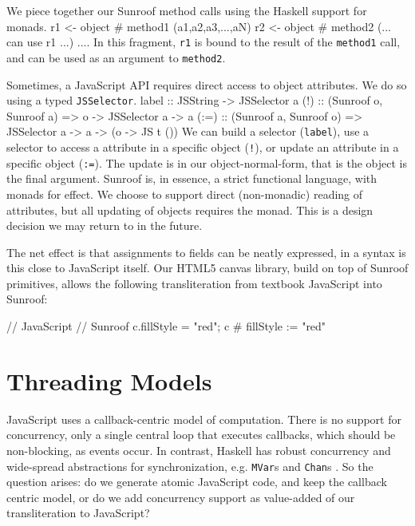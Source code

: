 \documentclass{llncs}
\newcommand{\Src}[1]{{\tt{#1}}}
\newenvironment{Code}{\verbatim}{\endverbatim}
\begin{document}
We piece together our Sunroof method calls using the Haskell support for monads.
\begin{Code}
  r1 <- object # method1 (a1,a2,a3,...,aN)
  r2 <- object # method2 (... can use r1 ...)
  ....
\end{Code} 
In this fragment, \Src{r1} is bound to the result of the \Src{method1} call,
and can be used as an argument to \Src{method2}.

Sometimes, a JavaScript API requires direct access to object attributes.
We do so using a typed \Src{JSSelector}.
\begin{Code}
label :: JSString -> JSSelector a
(!)   :: (Sunroof o, Sunroof a) => o -> JSSelector a -> a
(:=)  :: (Sunroof a, Sunroof o) 
      => JSSelector a -> a -> (o -> JS t ())
\end{Code}
We can build a selector (\Src{label}), use a selector to access a attribute in a specific
object (\Src{!}), or update an attribute in a specific object (\Src{:=}).
The update is in our object-normal-form, that is the object is the final argument.
Sunroof is, in essence, a strict functional language, with monads for effect.
We choose to support direct (non-monadic) reading of attributes, but
all updating of objects requires the monad.
This is a design decision we may return to in the future.

The net effect is that assignments to fields can be neatly expressed,
in a syntax is this close to JavaScript itself. Our HTML5 canvas library,
build on top of Sunroof primitives, allows the following transliteration
from textbook JavaScript into Sunroof:

\begin{Code}
  // JavaScript                         // Sunroof
  c.fillStyle = "red";                  c # fillStyle := "red"
\end{Code}



\section{Threading Models}
\label{sec:threading-models}

JavaScript uses a callback-centric model of computation. There
is no support for concurrency, only a single central loop that executes
callbacks, which should be non-blocking, as events occur.
In contrast, Haskell has robust concurrency and wide-spread 
abstractions for synchronization, e.g. \Src{MVar}s and \Src{Chan}s
\cite{Jones:96:ConcurrentHaskell}.
So the question arises: do we generate atomic JavaScript code, 
and keep the callback centric model, or do we add concurrency
support as value-added of our transliteration to JavaScript?
\end{document}
